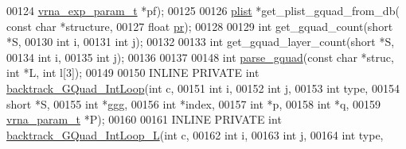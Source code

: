 \begin{DoxyCode}
00124                                       \hyperlink{group__energy__parameters_structvrna__exp__param__s}{vrna\_exp\_param\_t} *pf);
00125 
00126 \hyperlink{group__data__structures_structvrna__plist__s}{plist}       *get\_plist\_gquad\_from\_db( \textcolor{keyword}{const} \textcolor{keywordtype}{char} *structure,
00127                                       \textcolor{keywordtype}{float} \hyperlink{fold__vars_8h_ac98ec419070aee6831b44e5c700f090f}{pr});
00128 
00129 \textcolor{keywordtype}{int}         get\_gquad\_count(\textcolor{keywordtype}{short} *S,
00130                             \textcolor{keywordtype}{int} i,
00131                             \textcolor{keywordtype}{int} j);
00132 
00133 \textcolor{keywordtype}{int}         get\_gquad\_layer\_count(\textcolor{keywordtype}{short} *S,
00134                             \textcolor{keywordtype}{int} i,
00135                             \textcolor{keywordtype}{int} j);
00136 
00137 
00148 \textcolor{keywordtype}{int}         \hyperlink{group__loops_gae41763215b9c64d2a7b67f0df8a28078}{parse\_gquad}(\textcolor{keyword}{const} \textcolor{keywordtype}{char} *struc, \textcolor{keywordtype}{int} *L, \textcolor{keywordtype}{int} l[3]);
00149 
00150 INLINE  PRIVATE \textcolor{keywordtype}{int} \hyperlink{group__loops_ga220c41e8dbcee940ac975b8ce88e55c5}{backtrack\_GQuad\_IntLoop}(\textcolor{keywordtype}{int} c,
00151                                             \textcolor{keywordtype}{int} i,
00152                                             \textcolor{keywordtype}{int} j,
00153                                             \textcolor{keywordtype}{int} type,
00154                                             \textcolor{keywordtype}{short} *S,
00155                                             \textcolor{keywordtype}{int} *ggg,
00156                                             \textcolor{keywordtype}{int} *index,
00157                                             \textcolor{keywordtype}{int} *p,
00158                                             \textcolor{keywordtype}{int} *q,
00159                                             \hyperlink{group__energy__parameters_structvrna__param__s}{vrna\_param\_t} *P);
00160 
00161 INLINE  PRIVATE \textcolor{keywordtype}{int} \hyperlink{group__loops_ga7b371308fa5a45c7ac353ef6ed1014de}{backtrack\_GQuad\_IntLoop\_L}(\textcolor{keywordtype}{int} c,
00162                                               \textcolor{keywordtype}{int} i,
00163                                               \textcolor{keywordtype}{int} j,
00164                                               \textcolor{keywordtype}{int} type,

\end{DoxyCode}

